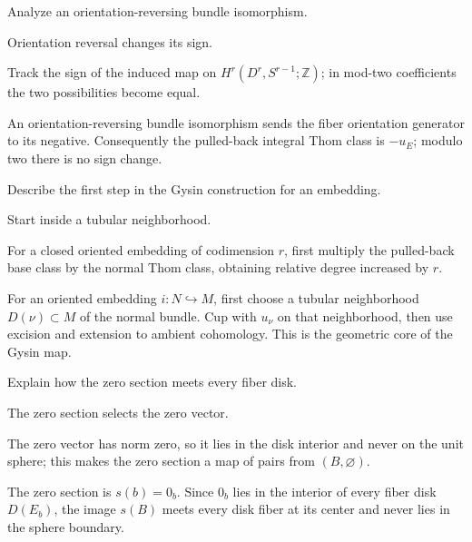 \begin{exercise}\label{exr:viii31-18}
Analyze an orientation-reversing bundle isomorphism.
\end{exercise}
\begin{hint}
Orientation reversal changes its sign.

Track the sign of the induced map on \(H^r(D^r,S^{r-1};\mathbb Z)\); in mod-two coefficients the two possibilities become equal.
\end{hint}
\begin{solution}
An orientation-reversing bundle isomorphism sends the fiber orientation generator to its negative. Consequently the pulled-back integral Thom class is \(-u_E\); modulo two there is no sign change.
\end{solution}

\begin{exercise}\label{exr:viii31-19}
Describe the first step in the Gysin construction for an embedding.
\end{exercise}
\begin{hint}
Start inside a tubular neighborhood.

For a closed oriented embedding of codimension \(r\), first multiply the pulled-back base class by the normal Thom class, obtaining relative degree increased by \(r\).
\end{hint}
\begin{solution}
For an oriented embedding \(i:N\hookrightarrow M\), first choose a tubular neighborhood \(D(\nu)\subset M\) of the normal bundle. Cup with \(u_\nu\) on that neighborhood, then use excision and extension to ambient cohomology. This is the geometric core of the Gysin map.
\end{solution}

\begin{exercise}\label{exr:viii31-20}
Explain how the zero section meets every fiber disk.
\end{exercise}
\begin{hint}
The zero section selects the zero vector.

The zero vector has norm zero, so it lies in the disk interior and never on the unit sphere; this makes the zero section a map of pairs from \((B,\varnothing)\).
\end{hint}
\begin{solution}
The zero section is \(s(b)=0_b\). Since \(0_b\) lies in the interior of every fiber disk \(D(E_b)\), the image \(s(B)\) meets every disk fiber at its center and never lies in the sphere boundary.
\end{solution}

